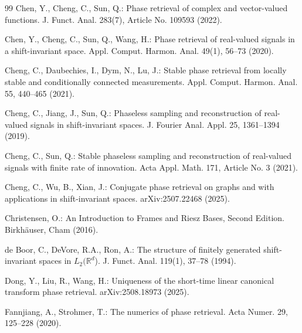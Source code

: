 \documentclass[11pt, reqno]{amsart}
\newcommand{\R}{\mathbb{R}}
\numberwithin{equation}{section}
\begin{document}
\begin{thebibliography}{99}
	Chen, Y., Cheng, C., Sun, Q.: Phase retrieval of complex and vector-valued functions. J. Funct. Anal. 283(7), Article No. 109593 (2022).

	Chen, Y., Cheng, C., Sun, Q., Wang, H.:  Phase retrieval of real-valued signals in a shift-invariant space. Appl. Comput. Harmon. Anal. 49(1), 56--73 (2020).


	Cheng, C., Daubechies, I., Dym, N., Lu, J.: Stable phase retrieval from locally stable and conditionally connected measurements. Appl. Comput. Harmon. Anal. 55, 440--465 (2021).

	Cheng, C., Jiang, J., Sun, Q.: Phaseless sampling and reconstruction of real-valued signals in shift-invariant spaces. J. Fourier Anal. Appl. 25, 1361--1394 (2019).

	Cheng, C., Sun, Q.: Stable phaseless sampling and reconstruction of real-valued signals with finite rate of innovation. Acta Appl. Math. 171, Article No. 3 (2021).

    Cheng, C., Wu, B., Xian, J.: Conjugate phase retrieval on graphs and with applications in shift-invariant spaces. 	arXiv:2507.22468 (2025).

Christensen, O.: An Introduction to Frames and Riesz Bases, Second Edition. Birkh{\"a}user, Cham (2016).


	de Boor, C., DeVore, R.A., Ron, A.: The structure of finitely generated shift-invariant spaces in $L_2 (\R^d$). J. Funct. Anal. 119(1), 37--78 (1994).

Dong, Y., Liu, R., Wang, H.: Uniqueness of the short-time linear canonical transform phase retrieval.  arXiv:2508.18973 (2025).

Fannjiang, A., Strohmer, T.: The numerics of phase retrieval. Acta Numer. 29, 125--228 (2020).



\end{thebibliography}
\end{document}
